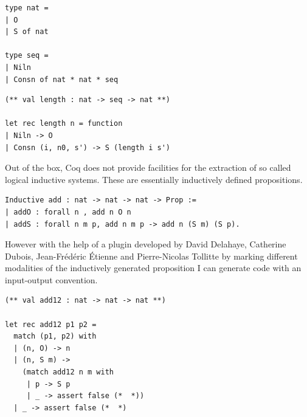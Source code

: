 \documentclass[12pt,twoside,notitlepage]{report}
\begin{document}
\begin{minipage}{\linewidth}
\begin{lstlisting}[caption={Coq to OCaml extraction of seq}]
type nat =
| O
| S of nat

type seq =
| Niln
| Consn of nat * nat * seq
\end{lstlisting}
\end{minipage}

\begin{minipage}{\linewidth}
\begin{lstlisting}[caption={Coq to OCaml extraction of length}]
(** val length : nat -> seq -> nat **)

let rec length n = function
| Niln -> O
| Consn (i, n0, s') -> S (length i s')
\end{lstlisting}
\end{minipage}


Out of the box, Coq does not provide facilities for the extraction of so called logical inductive systems. These are essentially inductively defined propositions.


\begin{minipage}{\linewidth}
\begin{lstlisting}[language={Coq},caption={Coq logical inductive example}]
Inductive add : nat -> nat -> nat -> Prop :=
| addO : forall n , add n O n
| addS : forall n m p, add n m p -> add n (S m) (S p).
\end{lstlisting}
\end{minipage}

However with the help of a plugin developed by David Delahaye, Catherine Dubois, Jean-Fr\'ed\'eric \'Etienne and Pierre-Nicolas Tollitte \cite{delahaye2007extracting,tollitte2012producing} by marking different modalities of the inductively generated proposition I can generate code with an input-output convention.



\begin{minipage}{\linewidth}
\begin{lstlisting}[language={Coq},caption={Coq to OCaml extraction of a logical inductive relation}]
(** val add12 : nat -> nat -> nat **)

let rec add12 p1 p2 =
  match (p1, p2) with
  | (n, O) -> n
  | (n, S m) ->
    (match add12 n m with
     | p -> S p
     | _ -> assert false (*  *))
  | _ -> assert false (*  *)
\end{lstlisting}
\end{minipage}
\end{document}
